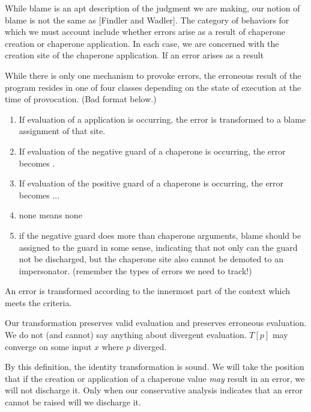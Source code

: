 \documentclass{sigplanconf}
\begin{document}
While blame is an apt description of the judgment we are making, our notion of blame is not the same as [Findler and Wadler].
The category of behaviors for which we must account include whether errors arise as a result of chaperone creation or chaperone application.
In each case, we are concerned with the creation site of the chaperone application.
If an error arises as a result

While there is only one mechanism to provoke errors, the erroneous result of the program resides in one of four classes depending on the state of execution at the time of provocation.
(Bad format below.)
\begin{enumerate}
\item If evaluation of a  application is occurring, the error is transformed to a blame assignment of that site.
\item If evaluation of the negative guard of a chaperone is occurring, the error becomes .
\item If evaluation of the positive guard of a chaperone is occurring, the error becomes ...
\item none means none
\item if the negative guard does more than chaperone arguments, blame should be assigned to the guard in some sense, indicating that not only can the guard not be discharged, but the chaperone site also cannot be demoted to an impersonator. (remember the types of errors we need to track!)
\end{enumerate}
An error is transformed according to the innermost part of the context which meets the criteria.


Our transformation preserves valid evaluation and preserves erroneous evaluation.
We do not (and cannot) say anything about divergent evaluation.
$T[p]$ may converge on some input $x$ where $p$ diverged.

By this definition, the identity transformation is sound. We will take the position that if the creation or application of a chaperone value \emph{may} result in an error, we will not discharge it. Only when our conservative analysis indicates that an error cannot be raised will we discharge it.
\end{document}
